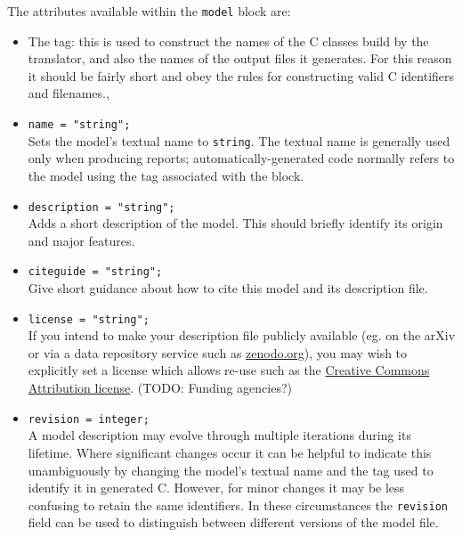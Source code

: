 \documentclass[11pt,a4paper]{article}
\newcommand{\block}[1]{\texttt{#1}}
\newcommand{\attribute}[1]{\texttt{#1}}
\newcommand\CC{C\nolinebreak\hspace{-.05em}\raisebox{.4ex}{\relsize{-3}{\textbf{+}}}\nolinebreak\hspace{-.10em}\raisebox{.4ex}{\relsize{-3}{\textbf{+}}}}
\begin{document}
The attributes available within the \block{model} block are:
\begin{itemize}
	\item The tag: this is used to construct the names of the
	{\CC} classes build by the translator,
	and also the names of the output files it generates.
	For this reason it should be fairly short and obey the
	rules for constructing valid {\CC} identifiers and
	filenames.,

    \item \attribute{name = "string";} \\
    Sets the model's textual name to \attribute{string}. The textual name
    is generally used only when producing reports;
    automatically-generated code normally refers to the model
    using the tag associated with the block.
    
    \item \attribute{description = "string";} \\
    Adds a short description of the model. This should briefly identify
    its origin and major features.
    
    \item \attribute{citeguide = "string";} \\
    Give short guidance about how to cite this model and its description file.
    
    \item \attribute{license = "string";} \\
    If you intend to make your description file publicly available (eg. on the
    arXiv or via a data repository service such as
    \href{http://www.zenodo.org}{zenodo.org}),
    you may wish to explicitly set a license which allows re-use
    such as the
    \href{https://creativecommons.org/licenses/}{Creative Commons Attribution license}.
    (TODO: Funding agencies?)
    
    \item \attribute{revision = integer;} \\
    A model description may evolve through multiple iterations during its
    lifetime.
    Where significant changes occur it can be helpful to indicate this
    unambiguously by changing the model's textual name and the tag
    used to identify it in generated {\CC}.
    However, for minor changes it may be less confusing to retain
    the same identifiers. In these circumstances the
    \attribute{revision} field can be used to
    distinguish between different versions
    of the model file.
    

\end{itemize}
\end{document}
